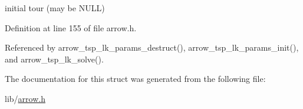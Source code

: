 initial tour (may be NULL) 

Definition at line 155 of file arrow.h.

Referenced by arrow\_\-tsp\_\-lk\_\-params\_\-destruct(), arrow\_\-tsp\_\-lk\_\-params\_\-init(), and arrow\_\-tsp\_\-lk\_\-solve().

The documentation for this struct was generated from the following file:\begin{CompactItemize}
\item 
lib/\hyperlink{arrow_8h}{arrow.h}\end{CompactItemize}
